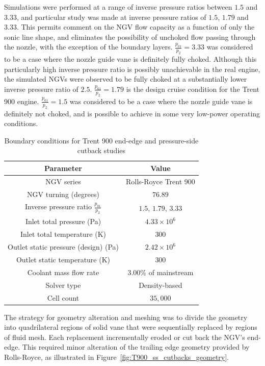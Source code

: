 \documentclass[a4paper, 11pt, oneside]{report}
\begin{document}
Simulations were performed at a range of inverse pressure ratios between $1.5$ and $3.33$, and particular study was made at inverse pressure ratios of $1.5$, $1.79$ and $3.33$. This permits comment on the NGV flow capacity as a function of only the sonic line shape, and eliminates the possibility of unchoked flow passing through the nozzle, with the exception of the boundary layers. $\frac{p_{01}}{p_2}=3.33$ was considered to be a case where the nozzle guide vane is definitely fully choked. Although this particularly high inverse pressure ratio is possibly unachievable in the real engine, the simulated NGVs were observed to be fully choked at a substantially lower inverse pressure ratio of $2.5$. $\frac{p_{01}}{p_2}=1.79$ is the design cruise condition for the Trent 900 engine. $\frac{p_{01}}{p_2}=1.5$ was considered to be a case where the nozzle guide vane is definitely not choked, and is possible to achieve in some very low-power operating conditions. 

\begin{table}[H]
\caption{Boundary conditions for Trent 900 end-edge and pressure-side cutback studies}
\label{ss_cutbacks_parameters}
\begin{center}
\begin{tabular}{|c|c|}
\hline
Parameter & Value\\
\hline
NGV series & Rolls-Royce Trent 900\\
NGV turning (degrees) & $76.89$\\
Inverse pressure ratio $\frac{p_{01}}{p_2}$ & $1.5$, $1.79$, $3.33$\\
Inlet total pressure (Pa) & $4.33 \times 10^6$\\
Inlet total temperature (K) & $300$\\
Outlet static pressure (design) (Pa) & $2.42 \times 10^6$\\
Outlet static temperature (K) & $300$\\
Coolant mass flow rate & $3.00\%$ of mainstream \\
Solver type & Density-based\\
Cell count & $35,000$\\
\hline
\end{tabular}
\end{center}
\end{table}

The strategy for geometry alteration and meshing was to divide the geometry into quadrilateral regions of solid vane that were sequentially replaced by regions of fluid mesh. Each replacement incrementally eroded or cut back the NGV's end-edge. This required minor alteration of the trailing edge geometry provided by Rolls-Royce, as illustrated in Figure~\ref{fig:T900_ss_cutbacks_geometry}.
\end{document}
